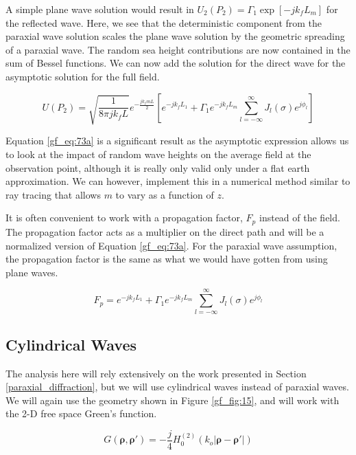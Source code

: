A simple plane wave solution would result in $U_2(P_2) = \Gamma_1\exp[-jk_fL_m]$ for the reflected wave. Here, we see that the deterministic component from the paraxial wave  solution scales the plane wave solution by the geometric spreading of a paraxial wave. The random sea height contributions are now contained in the sum of Bessel functions. We can now add the solution for the direct wave for the asymptotic solution for the full field.

\begin{equation}
\boxed{U(P_2) = \sqrt{\frac{1}{8\pi jk_f L}}e^{-\frac{jk_fmL}{2}} \left[e^{-jk_fL_1}+\Gamma_1e^{-jk_fL_m} \sum_{l=-\infty}^{\infty}J_l(\sigma)e^{j\phi_l}\right]}
\label{gf_eq:73a}
\end{equation}
\renewcommand{\baselinestretch}{2} \small\normalsize

Equation \ref{gf_eq:73a} is a significant result as the asymptotic expression allows us to look at the impact of random wave heights on the average field at the observation point, although it is really only valid only under a flat earth approximation. We can however, implement this in a numerical method similar to ray tracing that allows $m$ to vary as a function of $z$.

It is often convenient to work with a propagation factor, $F_p$ instead of the field. The propagation factor acts as a multiplier on the direct path and will be a normalized version of Equation \ref{gf_eq:73a}. For the paraxial wave assumption, the propagation factor is the same as what we would have gotten from using plane waves.

\begin{equation}
F_p = e^{-jk_fL_1}+\Gamma_1e^{-jk_fL_m} \sum_{l=-\infty}^{\infty}J_l(\sigma)e^{j\phi_l}
\label{gf_eq:73ab}
\end{equation}
\renewcommand{\baselinestretch}{2} \small\normalsize

\subsection{Cylindrical Waves}\label{cylindrical_diffraction}
The analysis here will rely extensively on the work presented in Section \ref{paraxial_diffraction}, but we will use cylindrical waves instead of paraxial waves. We will again use the geometry shown in Figure \ref{gf_fig:15}, and will work with the 2-D free space Green's function.

\begin{equation}
G\left(\boldsymbol{\rho},\boldsymbol{\rho}'\right) = -\frac{j}{4}H_0^{(2)}\left(k_o|\boldsymbol{\rho} - \boldsymbol{\rho}' | \right)
\label{cyl_eq:1}
\end{equation}
\renewcommand{\baselinestretch}{2} \small\normalsize

